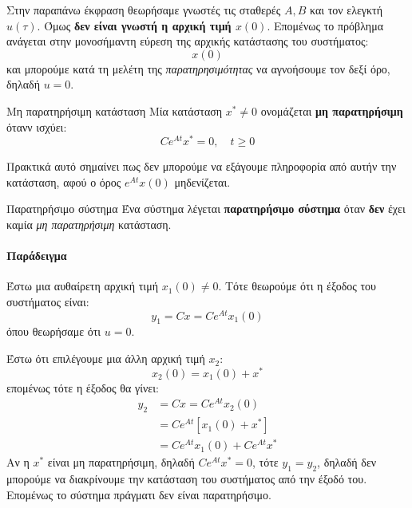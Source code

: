 \documentclass[11pt,a4paper,notitlepage,fleqn]{article}
\begin{document}
Στην παραπάνω έκφραση θεωρήσαμε γνωστές τις σταθερές \( A,B \) και
τον ελεγκτή \( u(τ) \). Όμως \textbf{δεν είναι γνωστή η αρχική τιμή
	\( x(0) \)}. Επομένως το πρόβλημα ανάγεται στην μονοσήμαντη
εύρεση της αρχικής κατάστασης του συστήματος:
\[
x(0)
\]
και μπορούμε κατά τη μελέτη της \textit{παρατηρησιμότητας} να αγνοήσουμε
τον δεξί όρο, δηλαδή \( u=0 \).

\begin{defn}{Μη παρατηρήσιμη κατάσταση}{}
	Μία κατάσταση \( x^* \neq 0 \) ονομάζεται \textbf{μη παρατηρήσιμη}
	ότανν ισχύει:
	\[
	Ce^{At} x^* = 0,\quad t\geq 0
	\]
\end{defn}

Πρακτικά αυτό σημαίνει πως δεν μπορούμε να εξάγουμε πληροφορία από
αυτήν την κατάσταση, αφού ο όρος \( e^{At}x(0) \) μηδενίζεται.

\begin{defn}{Παρατηρήσιμο σύστημα}{}
	Ένα σύστημα λέγεται \textbf{παρατηρήσιμο σύστημα} όταν \textbf{δεν} έχει
	καμία \textit{μη παρατηρήσιμη} κατάσταση.
\end{defn}

\paragraph{Παράδειγμα}
Έστω μια αυθαίρετη αρχική τιμή \( x_1(0) \neq 0 \).
Τότε θεωρούμε ότι η έξοδος του συστήματος είναι:
\[
y_1 = Cx = Ce^{At} x_1(0)
\]
όπου θεωρήσαμε ότι \( u=0 \).

Έστω ότι επιλέγουμε μια άλλη αρχική τιμή \( x_2 \):
\[
x_2(0) = x_1(0) + x^*
\]
επομένως τότε η έξοδος θα γίνει:
\begin{align*}
	y_2 &= Cx = Ce^{At}x_2(0) \\
	&= Ce^{At}\left[ x_1(0) + x^* \right]
	\\ &= Ce^{At}x_1(0) + Ce^{At}x^*
\end{align*}
Αν η \( x^* \) είναι μη παρατηρήσιμη, δηλαδή \( Ce^{At}x^* = 0 \), τότε
\( y_1 = y_2 \), δηλαδή δεν μπορούμε να διακρίνουμε την κατάσταση του
συστήματος από την έξοδό του. Επομένως το σύστημα πράγματι δεν είναι
παρατηρήσιμο.
\end{document}
